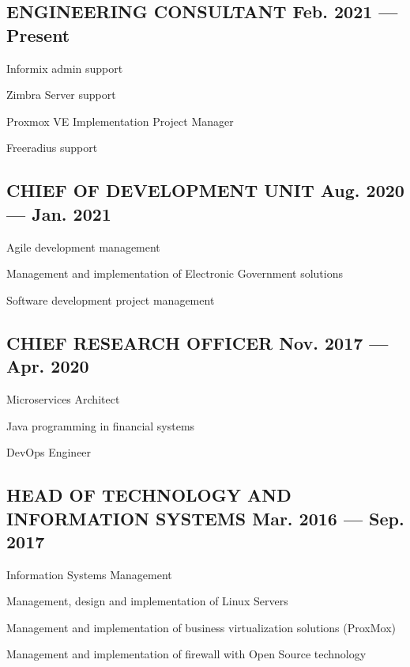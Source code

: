 \documentclass[letter,10pt]{article}
\begin{document}
\subsection{{ENGINEERING CONSULTANT  \hfill Feb. 2021 --- Present}}
\begin{zitemize}
\item	Informix admin support 
\item	Zimbra Server support 
\item	Proxmox VE Implementation Project Manager
\item	Freeradius support
\end{zitemize}
\vspace*{2mm}
\subsection{{CHIEF OF DEVELOPMENT UNIT \hfill Aug. 2020 --- Jan. 2021}}
\begin{zitemize}
\item Agile development management
\item Management and implementation of Electronic Government solutions
\item Software development project management
\end{zitemize}
\vspace*{2mm}
\subsection{{CHIEF RESEARCH OFFICER \hfill Nov. 2017 --- Apr. 2020}}
\begin{zitemize}
\item Microservices Architect
\item Java programming in financial systems
\item DevOps Engineer
\end{zitemize}
\vspace*{2mm}
\subsection{{HEAD OF TECHNOLOGY AND INFORMATION SYSTEMS \hfill Mar. 2016 --- Sep. 2017}}
\begin{zitemize}
\item Information Systems Management
\item Management, design and implementation of Linux Servers
\item Management and implementation of business virtualization solutions (ProxMox)
\item Management and implementation of firewall with Open Source technology
\end{zitemize}
\vspace*{2mm}
\end{document}
